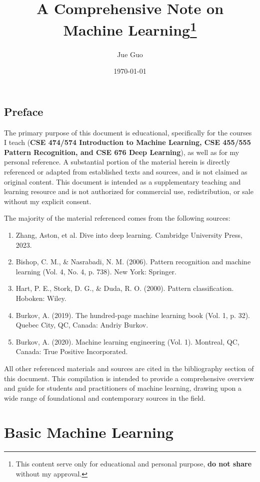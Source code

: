 \documentclass[10pt]{book}
\title{A Comprehensive Note on Machine Learning\footnote{This content serve only for educational and personal purpose, \textbf{do not share} without my approval.}}
\author{Jue Guo}
\date{\today}
\begin{document}
\frontmatter
\maketitle
\tableofcontents
\chapter*{Preface}

The primary purpose of this document is educational, specifically for the courses I teach (\textbf{CSE 474/574 Introduction to Machine Learning, CSE 455/555 Pattern Recognition, and CSE 676 Deep Learning}), as well as for my personal reference. A substantial portion of the material herein is directly referenced or adapted from established texts and sources, and is not claimed as original content. This document is intended as a supplementary teaching and learning resource and is not authorized for commercial use, redistribution, or sale without my explicit consent.

The majority of the material referenced comes from the following sources:

{
\renewcommand{\labelenumi}{[\theenumi]}
\setcounter{enumi}{0} %

\begin{enumerate}
	\item Zhang, Aston, et al. Dive into deep learning. Cambridge University Press, 2023.
	\item Bishop, C. M., \& Nasrabadi, N. M. (2006). Pattern recognition and machine learning (Vol. 4, No. 4, p. 738). New York: Springer.
	\item Hart, P. E., Stork, D. G., \& Duda, R. O. (2000). Pattern classification. Hoboken: Wiley.
	\item Burkov, A. (2019). The hundred-page machine learning book (Vol. 1, p. 32). Quebec City, QC, Canada: Andriy Burkov.
	\item Burkov, A. (2020). Machine learning engineering (Vol. 1). Montreal, QC, Canada: True Positive Incorporated.
\end{enumerate}
}

All other referenced materials and sources are cited in the bibliography section of this document. This compilation is intended to provide a comprehensive overview and guide for students and practitioners of machine learning, drawing upon a wide range of foundational and contemporary sources in the field.

\mainmatter
\part{Basic Machine Learning}


\end{document}
